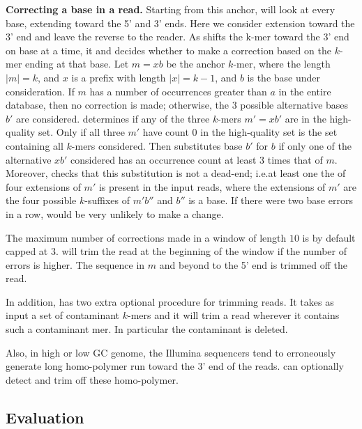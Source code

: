 \documentclass[10pt]{bmc_article}
\newenvironment{bmcformat}{\fussy\setboolean{publ}{true}}{\fussy}
\begin{document}
\begin{bmcformat}
{\bf Correcting a base in a read.}
Starting from this anchor, \quorum will look at every base, extending toward the 5' and 3' ends.  Here we consider extension toward the 3' end and leave the reverse to the reader. As \quorum shifts the k-mer toward the 3' end on base at a time, it and decides whether 
to make a correction based on the $k$-mer ending at that base.
Let $m = xb$ be the anchor $k$-mer, where the length $|m| = k$, and $x$ is a prefix with length $|x| = k - 1$, and $b$ is the base under consideration.
If $m$ has a number of occurrences greater than $a$ in the entire database, then no correction is made; otherwise, the 3 possible alternative bases $b'$ are considered.
\quorum determines if any of the three $k$-mers $m' = xb'$ are in the high-quality set.
Only if all three $m'$ have count 0 in the high-quality set is the set containing all $k$-mers considered. Then
\quorum substitutes base $b'$ for $b$ if only one of the alternative $xb'$ considered has an occurrence count at least 3 times that of $m$.
Moreover, \quorum checks that this substitution is not a dead-end; i.e.\@ at least one the of four extensions of $m'$ is present in the input reads, where the extensions of $m'$ are the four possible $k$-suffixes of $m'b''$ and $b''$ is a base. If there were two base errors in a row, \quorum would be very unlikely to make a change. 

The maximum number of corrections made in a window of length $10$ is by default capped at $3$.
\quorum will trim the read at the beginning of the window if the number of errors is higher.
The sequence in $m$ and beyond to the 5' end is trimmed off the read. 

In addition, \quorum has two extra optional procedure for trimming reads. 
It takes as input a set of contaminant $k$-mers and it will trim a read wherever it contains such a contaminant mer. In particular the contaminant is deleted.

Also, in high or low GC genome, the Illumina sequencers tend to erroneously generate long homo-polymer run toward the 3' end of the reads.
\quorum can optionally detect and trim off these homo-polymer.


\subsection*{Evaluation}


\end{bmcformat}
\end{document}
